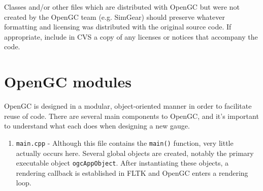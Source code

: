 \documentclass[11pt]{article}
\begin{document}
\noindent Classes and/or other files which are distributed with OpenGC but were not created by the OpenGC team (e.g. SimGear) should preserve whatever formatting and licensing was distributed with the original source code. If appropriate, include in CVS a copy of any licenses or notices that accompany the code.

\section{OpenGC modules}

OpenGC is designed in a modular, object-oriented manner in order to facilitate reuse of code. There are several main components to OpenGC, and it's important to understand what each does when designing a new gauge.

\begin{enumerate}

\item \texttt{main.cpp} - Although this file contains the \texttt{main()} function, very little actually occurs here. Several global objects are created, notably the primary executable object \texttt{ogcAppObject}. After instantiating these objects, a rendering callback is established in FLTK and OpenGC enters a rendering loop.

\end{enumerate}
\end{document}
